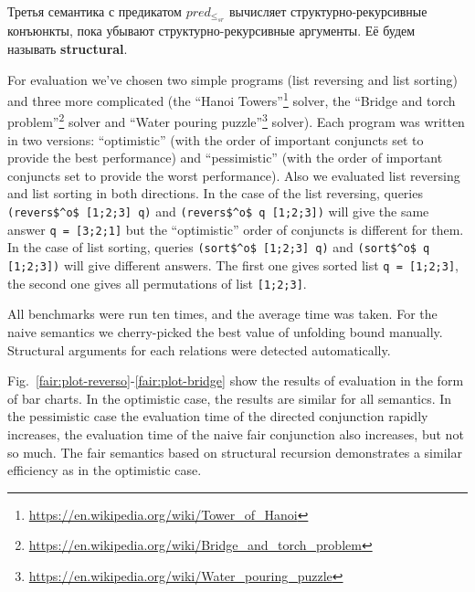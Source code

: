 Третья семантика с предикатом $pred_{\leq_{sr}}$ вычисляет структурно-рекурсивные конъюнкты, пока убывают структурно-рекурсивные аргументы. Её будем называть {\bf structural}.

For evaluation we've chosen two simple programs (list reversing and list sorting) and three more complicated (the ``Hanoi Towers''\footnote{\url{https://en.wikipedia.org/wiki/Tower_of_Hanoi}} solver, the
``Bridge and torch problem''\footnote{\url{https://en.wikipedia.org/wiki/Bridge_and_torch_problem}} solver and ``Water pouring puzzle''\footnote{\url{https://en.wikipedia.org/wiki/Water_pouring_puzzle}} solver).
Each program was written in two versions: ``optimistic'' (with the order of important conjuncts set to provide the best performance) and ``pessimistic'' (with the order of important
conjuncts set to provide the worst performance). Also we evaluated list reversing and list sorting in both directions. In the case of the list reversing, queries \lstinline{(revers$^o$ [1;2;3] q)} and \lstinline{(revers$^o$ q [1;2;3])}\! will give the same answer \lstinline{q = [3;2;1]} but the ``optimistic'' order of conjuncts is different for them. In the case of list sorting, queries \lstinline{(sort$^o$ [1;2;3] q)} and \lstinline{(sort$^o$ q [1;2;3])} will give different answers. The first one gives sorted list \lstinline{q = [1;2;3]}, the second one gives all permutations of list \lstinline{[1;2;3]}\!\!. 

All benchmarks were run ten times, and the average time was taken. For the naive  semantics we cherry-picked the best value of unfolding bound manually. Structural arguments for each relations were detected automatically.

Fig.~\ref{fair:plot-reverso}-\ref{fair:plot-bridge} show the results of evaluation in the form of bar charts. In the optimistic case, the results are similar for all semantics.
In the pessimistic case the evaluation time of the directed conjunction rapidly increases, the evaluation time of the naive fair conjunction also increases, but not so much.
The fair semantics based on structural recursion demonstrates a similar efficiency as in the optimistic case.

